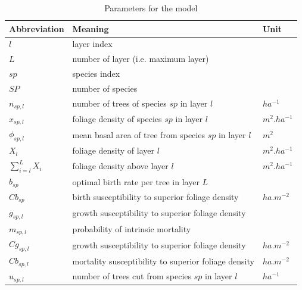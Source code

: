 \documentclass{article}
\begin{document}
\begin{table}[t]
    \centering
    \begin{tabular}{l l l}
    \hline
    \hline
    \textbf{Abbreviation} & \textbf{Meaning} & \textbf{Unit} \\
    \hline
    \hline
    $l$            & layer index                                                 &          \\
    $L$            & number of layer (i.e. maximum layer)                        &          \\
    $sp$           & species index                                               &          \\
    $SP$           & number of species                                           &            \\
    $n_{sp,l}$     & number of trees of species $sp$ in layer $l$                & $ha^{-1}$  \\    
    $x_{sp,l}$     & foliage density of species $sp$ in layer $l$                & $m^2.ha^{-1}$  \\
    $\phi_{sp,l}$     & mean basal area of tree from species $sp$ in layer $l$    & $m^2$  \\
    $X_{l}$        & foliage density of layer $l$                                & $m^2.ha^{-1}$  \\ 
    $\sum_{i = l}^{L} X_{i}$     & foliage density above layer $l$      & $m^2.ha^{-1}$  \\ 
    $b_{sp}$       & optimal birth rate per tree in layer $L$    &  \\
    $Cb_{sp}$      & birth susceptibility to superior foliage density    & $ha.m^{-2}$           \\
    $g_{sp,l}$     & growth susceptibility to superior foliage density           &  \\
    $m_{sp,l}$     & probability of intrinsic mortality           & \\
    $Cg_{sp,l}$    & growth susceptibility to superior foliage density            &   $ha.m^{-2}$  \\
    $Cb_{sp,l}$    & mortality susceptibility to superior foliage density            & $ha.m^{-2}$    \\
    $u_{sp,l}$     & number of trees cut from species $sp$ in layer $l$           & $ha^{-1}$ \\
    \hline
    \hline
    \end{tabular}
    \caption{Parameters for the model}
\label{tab:coef}
\end{table}
\end{document}
